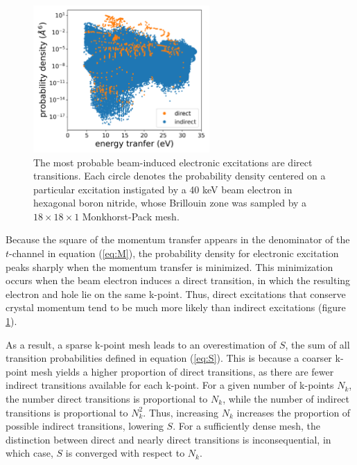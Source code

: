 \documentclass{article}
\begin{document}
\begin{figure}[H]
  \centering
  \includegraphics[width=0.6\textwidth]{figures/scatterDirHBN.png}
  \caption{
    The most probable beam-induced electronic excitations are direct
    transitions.
    Each circle denotes the probability density centered on a particular
    excitation instigated by a 40 keV beam electron in hexagonal boron nitride,
    whose Brillouin zone was sampled by a $18\times18\times1$ Monkhorst-Pack
    mesh.
  }
  \label{fig:scatter}
\end{figure}
%
Because the square of the momentum transfer appears in the denominator of the
$t$-channel in equation (\ref{eq:M}), the probability density for electronic
excitation peaks sharply when the momentum transfer is minimized.
This minimization occurs when the beam electron induces a direct transition,
in which the resulting electron and hole lie on the same k-point.
Thus, direct excitations that conserve crystal momentum tend to be much more
likely than indirect excitations (figure \ref{fig:scatter}).

As a result, a sparse k-point mesh leads to an overestimation of $S$,
the sum of all transition probabilities defined in equation (\ref{eq:S}).
This is because a coarser k-point mesh yields a higher proportion of direct
transitions, as there are fewer indirect transitions available for each
k-point.
For a given number of k-points $N_k$, the number direct transitions is
proportional to $N_k$, while the number of indirect transitions is proportional
to $N_k^2$.
Thus, increasing $N_k$ increases the proportion of possible indirect
transitions, lowering $S$.
For a sufficiently dense mesh, the distinction between direct and nearly direct
transitions is inconsequential, in which case, $S$ is converged with respect to
$N_k$.
\end{document}
